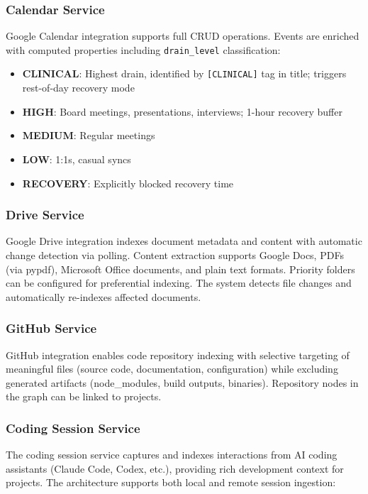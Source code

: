 \documentclass[11pt,a4paper]{article}
\begin{document}
\subsubsection{Calendar Service}

Google Calendar integration supports full CRUD operations. Events are enriched with computed properties including \texttt{drain\_level} classification:

\begin{itemize}
    \item \textbf{CLINICAL}: Highest drain, identified by \texttt{[CLINICAL]} tag in title; triggers rest-of-day recovery mode
    \item \textbf{HIGH}: Board meetings, presentations, interviews; 1-hour recovery buffer
    \item \textbf{MEDIUM}: Regular meetings
    \item \textbf{LOW}: 1:1s, casual syncs
    \item \textbf{RECOVERY}: Explicitly blocked recovery time
\end{itemize}

\subsubsection{Drive Service}

Google Drive integration indexes document metadata and content with automatic change detection via polling. Content extraction supports Google Docs, PDFs (via pypdf), Microsoft Office documents, and plain text formats. Priority folders can be configured for preferential indexing. The system detects file changes and automatically re-indexes affected documents.

\subsubsection{GitHub Service}

GitHub integration enables code repository indexing with selective targeting of meaningful files (source code, documentation, configuration) while excluding generated artifacts (node\_modules, build outputs, binaries). Repository nodes in the graph can be linked to projects.

\subsubsection{Coding Session Service}

The coding session service captures and indexes interactions from AI coding assistants (Claude Code, Codex, etc.), providing rich development context for projects. The architecture supports both local and remote session ingestion:
\end{document}

